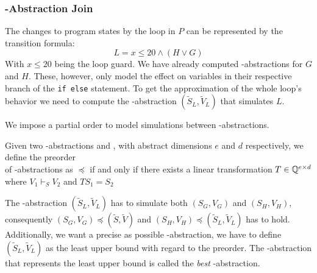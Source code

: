 \subsubsection{\qvasr-Abstraction Join}
The changes to program states by the loop in $P$ can be represented by the transition formula: 
\begin{equation*}
	L = x \leq 20 \land (H \lor G)
\end{equation*}
With $x \leq 20$ being the loop guard. We have already computed \qvasr-abstractions for $G$ and $H$. These, however, only model the effect on variables in their respective branch of the \texttt{if else} statement. To get the approximation of the whole loop's behavior we need to compute the \qvasr-abstraction $(\tilde{S}_L, \tilde{V}_L)$ that simulates $L$. \\ \par We impose a partial order to model simulations between \qvasr-abstractions.
\begin{mydef}
	Given two \qvasr-abstractions   and , with abstract dimensions $e$ and $d$ respectively, we define the preorder \\ of \qvasr-abstractions as  $\preceq$  if and only if there exists a linear transformation $T \in  \mathbb{Q} ^{e \times d}$ where $V_1 \vdash_S V_2$ and $TS_1 = S_2$
\end{mydef}
The \qvasr-abstraction $(\tilde{S}_L, \tilde{V}_L)$ has to simulate both $(S_G, V_G)$ and $(S_H, V_H)$, consequently $(S_G, V_G) \preceq (\tilde{S}, \tilde{V})$ and $(S_H, V_H) \preceq (\tilde{S}_L, \tilde{V}_L)$ has to hold. Additionally, we want a precise as possible \qvasr-abstraction, we have to define $(\tilde{S}_L, \tilde{V}_L)$ as the least upper bound with regard to the preorder. The \qvasr-abstraction that represents the least upper bound is called the \textsl{best} \qvasr-abstraction. \\ \par

